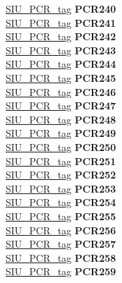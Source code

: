 \begin{DoxyCompactItemize}
\begin{tabbing}
\>\>\mbox{\hyperlink{unionSIU__tag_1_1SIU__PCR__tag}{SIU\_PCR\_tag}} {\bfseries PCR240}\\
\>\>\mbox{\hyperlink{unionSIU__tag_1_1SIU__PCR__tag}{SIU\_PCR\_tag}} {\bfseries PCR241}\\
\>\>\mbox{\hyperlink{unionSIU__tag_1_1SIU__PCR__tag}{SIU\_PCR\_tag}} {\bfseries PCR242}\\
\>\>\mbox{\hyperlink{unionSIU__tag_1_1SIU__PCR__tag}{SIU\_PCR\_tag}} {\bfseries PCR243}\\
\>\>\mbox{\hyperlink{unionSIU__tag_1_1SIU__PCR__tag}{SIU\_PCR\_tag}} {\bfseries PCR244}\\
\>\>\mbox{\hyperlink{unionSIU__tag_1_1SIU__PCR__tag}{SIU\_PCR\_tag}} {\bfseries PCR245}\\
\>\>\mbox{\hyperlink{unionSIU__tag_1_1SIU__PCR__tag}{SIU\_PCR\_tag}} {\bfseries PCR246}\\
\>\>\mbox{\hyperlink{unionSIU__tag_1_1SIU__PCR__tag}{SIU\_PCR\_tag}} {\bfseries PCR247}\\
\>\>\mbox{\hyperlink{unionSIU__tag_1_1SIU__PCR__tag}{SIU\_PCR\_tag}} {\bfseries PCR248}\\
\>\>\mbox{\hyperlink{unionSIU__tag_1_1SIU__PCR__tag}{SIU\_PCR\_tag}} {\bfseries PCR249}\\
\>\>\mbox{\hyperlink{unionSIU__tag_1_1SIU__PCR__tag}{SIU\_PCR\_tag}} {\bfseries PCR250}\\
\>\>\mbox{\hyperlink{unionSIU__tag_1_1SIU__PCR__tag}{SIU\_PCR\_tag}} {\bfseries PCR251}\\
\>\>\mbox{\hyperlink{unionSIU__tag_1_1SIU__PCR__tag}{SIU\_PCR\_tag}} {\bfseries PCR252}\\
\>\>\mbox{\hyperlink{unionSIU__tag_1_1SIU__PCR__tag}{SIU\_PCR\_tag}} {\bfseries PCR253}\\
\>\>\mbox{\hyperlink{unionSIU__tag_1_1SIU__PCR__tag}{SIU\_PCR\_tag}} {\bfseries PCR254}\\
\>\>\mbox{\hyperlink{unionSIU__tag_1_1SIU__PCR__tag}{SIU\_PCR\_tag}} {\bfseries PCR255}\\
\>\>\mbox{\hyperlink{unionSIU__tag_1_1SIU__PCR__tag}{SIU\_PCR\_tag}} {\bfseries PCR256}\\
\>\>\mbox{\hyperlink{unionSIU__tag_1_1SIU__PCR__tag}{SIU\_PCR\_tag}} {\bfseries PCR257}\\
\>\>\mbox{\hyperlink{unionSIU__tag_1_1SIU__PCR__tag}{SIU\_PCR\_tag}} {\bfseries PCR258}\\
\>\>\mbox{\hyperlink{unionSIU__tag_1_1SIU__PCR__tag}{SIU\_PCR\_tag}} {\bfseries PCR259}\\

\end{tabbing}
\end{DoxyCompactItemize}
